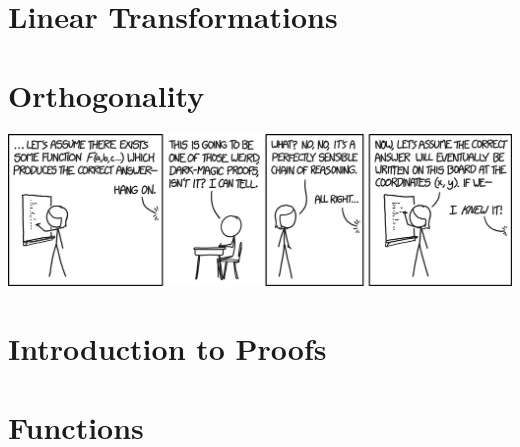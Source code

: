 \documentclass[oneside]{book}
\begin{document}
\chapter{Linear Transformations}

    

\begin{savequote}

\end{savequote}
\chapter{Orthogonality}

    

\appendix
\appendixpage
\noappendicestocpagenum
\addappheadtotoc
\begin{savequote}
    \includegraphics[scale=0.5]{Graphics/proofxkcd.png}
\end{savequote}
\chapter{Introduction to Proofs} \label{appendix:a}

    

\begin{savequote}
\end{savequote}
    \chapter{Functions} \label{appendix:b}
    
\end{document}

